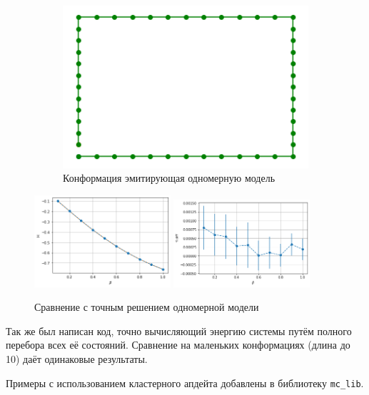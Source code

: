 \begin{figure}[H]
	\centering
	\begin{subfigure}[t]{0.45\textwidth}
		\includegraphics[width = \textwidth]{../images/1D_conf.png} 
		\caption{Конформация эмитирующая одномерную модель}
	\end{subfigure}
	\includegraphics[width = 0.45\textwidth]{../images/1D_ene.png}
	\includegraphics[width = 0.45\textwidth]{../images/1D_ene_diff.png} 
	\caption{Сравнение с точным решением одномерной модели}
\end{figure}

Так же был написан код, точно вычисляющий энергию системы путём полного перебора всех её состояний. Сравнение на маленьких конформациях (длина до 10) даёт одинаковые результаты.



Примеры с использованием кластерного апдейта добавлены в библиотеку \texttt{mc\_lib}.